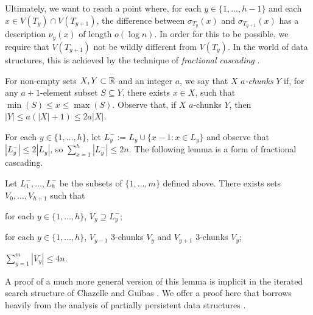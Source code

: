 \documentclass[kpfonts]{patmorin}
\begin{document}
Ultimately, we want to reach a point where, for each $y\in\{1,\ldots,h-1\}$ and each $x\in V(T_y)\cap V(T_{y+1})$, the difference between $\sigma_{T_y}(x)$ and $\sigma_{T_{y+1}}(x)$ has a description $\nu_y(x)$ of length $o(\log n)$.  In order for this to be possible, we require that $V(T_{y+1})$ not be wildly different from $V(T_{y})$.  In the world of data structures, this is achieved by the technique of \emph{fractional cascading} \cite{chazelle.guibas:fractional1, chazelle.guibas:fractional2, vaishnavi.wood:rectilinear}.

For non-empty sets $X,Y\subset \mathbb{R}$ and an integer $a$, we say that $X$ \emph{$a$-chunks} $Y$ if, for any $a+1$-element subset $S\subseteq Y$, there exists $x\in X$, such that $\min(S)\le x\le \max(S)$. Observe that, if $X$ $a$-chunks $Y$, then $|Y|\le a(|X|+1)\le 2a|X|$.

For each $y\in\{1,\ldots,h\}$, let $L^-_y:=L_y\cup \{x-1:x\in L_y\}$ and observe that $|L^-_y|\le 2|L_y|$, so $\sum_{x=1}^h|L^-_y| \le 2n$.  The following lemma is a form of fractional cascading.  

\begin{lem}
  Let $L^-_1,\ldots,L^-_h$ be the subsets of $\{1,\ldots,m\}$ defined above.  There exists sets $V_0,\ldots,V_{h+1}$ such that
  \begin{compactenum}
    \item for each $y\in\{1,\ldots,h\}$, $V_y\supseteq L^-_y$;
    \item for each $y\in\{1,\ldots,h\}$, $V_{y-1}$ 3-chunks $V_y$ and $V_{y+1}$ 3-chunks $V_y$;
    \item $\sum_{y=1}^m |V_y|\le 4n$.
  \end{compactenum}
\end{lem}

A proof of a much more general version of this lemma is implicit in the iterated search structure of Chazelle and Guibas \cite{chazelle.guibas:fractional1}.   We offer a proof here that borrows heavily from the analysis of partially persistent data structures \cite[Section~2.3]{driscoll.sarnak.ea:making}.
\end{document}
